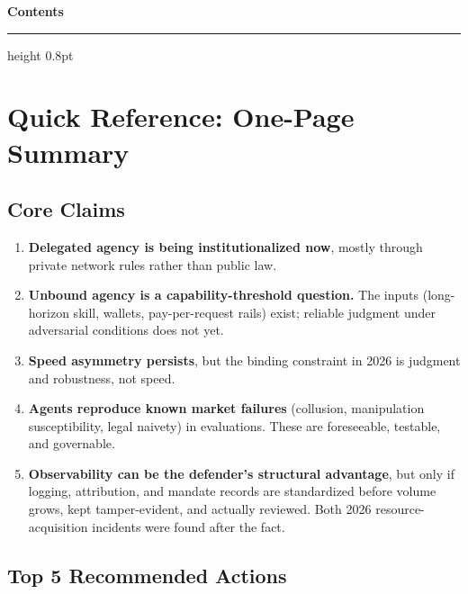 \documentclass[11pt,letterpaper]{article}
\makeatletter
\newcommand{\inlinetoc}{\@starttoc{toc}}
\makeatother
\begin{document}
\newpage
\thispagestyle{empty}
{\centering\color{deepindigo}\Large\bfseries Contents\par}
\vspace{0.1cm}
{\color{networkblue!50}\hrule height 0.8pt}
{\small{}
\vspace{0.4cm}
\inlinetoc
}
\newpage

\section*{Quick Reference: One-Page Summary}
\begingroup\small{}

\subsection*{Core Claims}

\begin{enumerate}
  \item \textbf{Delegated agency is being institutionalized now}, mostly through private network rules rather than public law.
  \item \textbf{Unbound agency is a capability-threshold question.} The inputs (long-horizon skill, wallets, pay-per-request rails) exist; reliable judgment under adversarial conditions does not yet.
  \item \textbf{Speed asymmetry persists}, but the binding constraint in 2026 is judgment and robustness, not speed.
  \item \textbf{Agents reproduce known market failures} (collusion, manipulation susceptibility, legal naivety) in evaluations. These are foreseeable, testable, and governable.
  \item \textbf{Observability can be the defender's structural advantage}, but only if logging, attribution, and mandate records are standardized before volume grows, kept tamper-evident, and actually reviewed. Both 2026 resource-acquisition incidents were found after the fact.
\end{enumerate}

\subsection*{Top 5 Recommended Actions}
\end{document}
